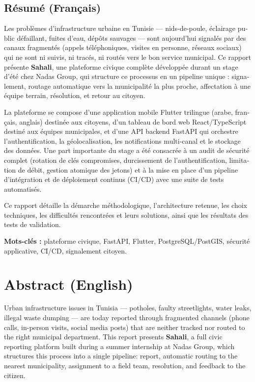 \documentclass[12pt, a4paper]{report}
\begin{document}
\begin{french}
\section*{Résumé (Français)}
Les problèmes d'infrastructure urbaine en Tunisie --- nids-de-poule, éclairage public défaillant, fuites d'eau, dépôts sauvages --- sont aujourd'hui signalés par des canaux fragmentés (appels téléphoniques, visites en personne, réseaux sociaux) qui ne sont ni suivis, ni tracés, ni routés vers le bon service municipal. Ce rapport présente \textbf{Sahali}, une plateforme civique complète développée durant un stage d'été chez Nadas Group, qui structure ce processus en un pipeline unique : signalement, routage automatique vers la municipalité la plus proche, affectation à une équipe terrain, résolution, et retour au citoyen.

La plateforme se compose d'une application mobile Flutter trilingue (arabe, français, anglais) destinée aux citoyens, d'un tableau de bord web React/TypeScript destiné aux équipes municipales, et d'une API backend FastAPI qui orchestre l'authentification, la géolocalisation, les notifications multi-canal et le stockage des données. Une part importante du stage a été consacrée à un audit de sécurité complet (rotation de clés compromises, durcissement de l'authentification, limitation de débit, gestion atomique des jetons) et à la mise en place d'un pipeline d'intégration et de déploiement continus (CI/CD) avec une suite de tests automatisés.

Ce rapport détaille la démarche méthodologique, l'architecture retenue, les choix techniques, les difficultés rencontrées et leurs solutions, ainsi que les résultats des tests de validation.

\textbf{Mots-clés :} plateforme civique, FastAPI, Flutter, PostgreSQL/PostGIS, sécurité applicative, CI/CD, signalement citoyen.
\end{french}

\bigskip

\section*{Abstract (English)}
Urban infrastructure issues in Tunisia --- potholes, faulty streetlights, water leaks, illegal waste dumping --- are today reported through fragmented channels (phone calls, in-person visits, social media posts) that are neither tracked nor routed to the right municipal department. This report presents \textbf{Sahali}, a full civic reporting platform built during a summer internship at Nadas Group, which structures this process into a single pipeline: report, automatic routing to the nearest municipality, assignment to a field team, resolution, and feedback to the citizen.
\end{document}

